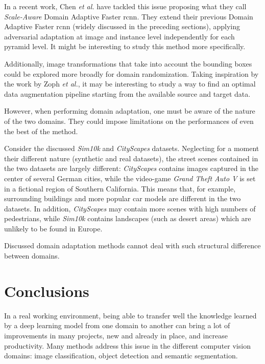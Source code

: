 \documentclass[%
    corpo=12pt,
    twoside,
    stile=classica,   
    tipotesi=magistrale,
    evenboxes,
    english,
	numerazioneromana,
]{toptesi}
\begin{document}
In a recent work, Chen \textit{et al.} have tackled this issue proposing what they call \textit{Scale-Aware} Domain Adaptive Faster \gls{rcnn}\cite{chen2021scale}. They extend their previous Domain Adaptive Faster \gls{rcnn} (widely discussed in the preceding sections), applying adversarial adaptation at image and instance level independently for each pyramid level. It might be interesting to study this method more specifically.

\medskip
Additionally, image transformations that take into account the bounding boxes could be explored more broadly for domain randomization. Taking inspiration by the work by Zoph \textit{et al.}\cite{zoph2019learning}, it may be interesting to study a way to find an optimal data augmentation pipeline starting from the available source and target data.

\bigskip
However, when performing domain adaptation, one must be aware of the nature of the two domains. They could impose limitations on the performances of even the best of the method.

Consider the discussed \textit{Sim10k} and \textit{CityScapes} datasets. Neglecting for a moment their different nature (synthetic and real datasets), the street scenes contained in the two datasets are largely different: \textit{CityScapes} contains images captured in the center of several German cities, while the video-game \textit{Grand Theft Auto V} is set in a fictional region of Southern California. This means that, for example, surrounding buildings and more popular car models are different in the two datasets. In addition, \textit{CityScapes} may contain more scenes with high numbers of pedestrians, while \textit{Sim10k} contains landscapes (such as desert areas) which are unlikely to be found in Europe. 

Discussed domain adaptation methods cannot deal with such structural difference between domains.

\chapter{Conclusions}
In a real working environment, being able to transfer well the knowledge learned by a deep learning model from one domain to another can bring a lot of improvements in many projects, new and already in place, and increase productivity. Many methods address this issue in the different computer vision domains: image classification, object detection and semantic segmentation.
\end{document}
